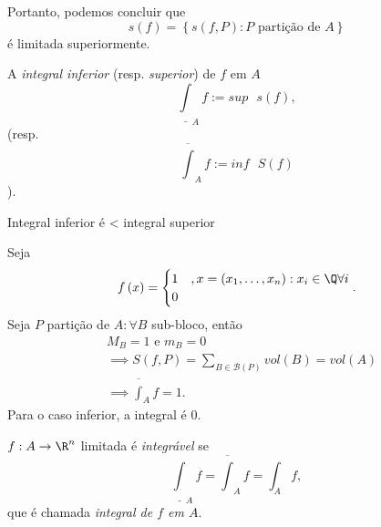Portanto, podemos concluir que \[
s\left( f \right) = \left\{ s\left( f,P \right) : P \text{ partição de }A \right\} 
\] é limitada superiormente.

\begin{definition}
    A \emph{integral inferior} (resp. \emph{superior}) de $f$ em $A$ \[
	\underline{\int}_A f := sup\text{ }s\left( f \right) 
,\] (resp. \[
	\overline{\int}_A f := inf\text{ }S\left( f \right) 
    \]).
\end{definition}

\begin{observe}
    Integral inferior é < integral superior
\end{observe}

\begin{eg}
    Seja \[
    f\left( x \right) = \begin{cases}
	1 &, x=\left( x_1,\ldots,x_n \right) : x_i\in \Q \forall i \\
	0
    \end{cases}
    .\]
    Seja $P$ partição de $A:\forall B $ sub-bloco, então
    \begin{align*}
	& M_B = 1 \text{ e }m_B=0 \\
	&\implies S\left( f, P \right) = \sum_{B\in \mathcal{B}\left( P \right) } vol\left( B \right)= vol \left( A \right) \\
	&\implies \overline{\int}_A f = 1
    .\end{align*}
    Para o caso inferior, a integral é 0.
\end{eg}

\begin{definition}
    $f:A\to \R^{n}$ limitada é \emph{integrável} se \[
	\underline{\int}_A f = \overline{\int}_A f = \int_A f
    ,\] que é chamada \emph{integral de $f$ em $A$}.
\end{definition}

